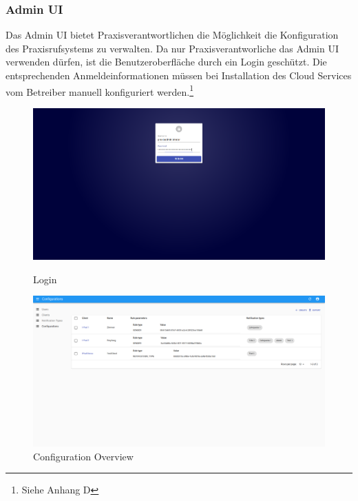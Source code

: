 \subsubsection{Admin UI}

Das Admin UI bietet Praxisverantwortlichen die Möglichkeit die Konfiguration des Praxisrufsystems zu verwalten.
Da nur Praxisverantworliche das Admin UI verwenden dürfen, ist die Benutzeroberfläche durch ein Login geschützt.
Die entsprechenden Anmeldeinformationen müssen bei Installation des Cloud Services vom Betreiber manuell konfiguriert werden.\footnote{Siehe Anhang D}

\begin{figure}[h]
    \centering
    \begin{minipage}[b]{0.4\textwidth}
        \includegraphics[width=\textwidth]{graphics/screenshots/adminui/login}
        \caption{Login}
    \end{minipage}
    \hfill
    \begin{minipage}[b]{0.4\textwidth}
        \includegraphics[width=\textwidth]{graphics/screenshots/adminui/configuration-all}
        \caption{Configuration Overview}
    \end{minipage}
    \label{fig:AdminUI-Screens1}
\end{figure}


